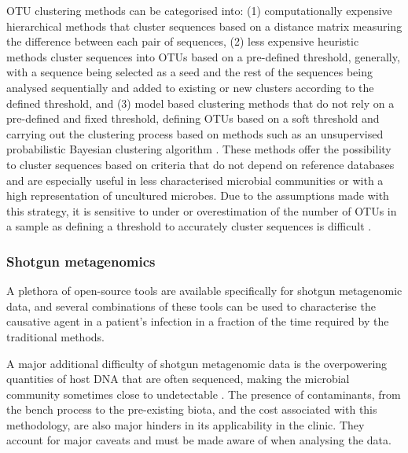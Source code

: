 OTU clustering methods can be categorised into: (1) computationally expensive hierarchical methods that cluster sequences based on a distance matrix measuring the difference between each pair of sequences, (2) less expensive heuristic methods cluster sequences into OTUs based on a pre-defined threshold, generally, with a sequence being selected as a seed and the rest of the sequences being analysed sequentially and added to existing or new clusters according to the defined threshold, and (3) model based clustering methods that do not rely on a pre-defined and fixed threshold, defining OTUs based on a soft threshold and carrying out the clustering process based on methods such as an unsupervised probabilistic Bayesian clustering algorithm \citep{hao_clustering_2011}. These methods offer the possibility to cluster sequences based on criteria that do not depend on reference databases and are especially useful in less characterised microbial communities or with a high representation of uncultured microbes. Due to the assumptions made with this strategy, it is sensitive to under or overestimation of the number of OTUs in a sample as defining a threshold to accurately cluster sequences is difficult \citep{westcott_novo_2015}.

\subsubsection{Shotgun metagenomics} \label{ssec:_intro_shotgun_metagenomics_bioinfo}

A plethora of open-source tools are available specifically for shotgun metagenomic data, and several combinations of these tools can be used to characterise the causative agent in a patient's infection in a fraction of the time required by the traditional methods. 

A major additional difficulty of shotgun metagenomic data is the overpowering quantities of host DNA that are often sequenced, making the microbial community sometimes close to undetectable \citep{couto_critical_2018}.
The presence of contaminants, from the bench process to the pre-existing biota, and the cost associated with this methodology, are also major hinders in its applicability in the clinic.
They account for major caveats and must be made aware of when analysing the data.


